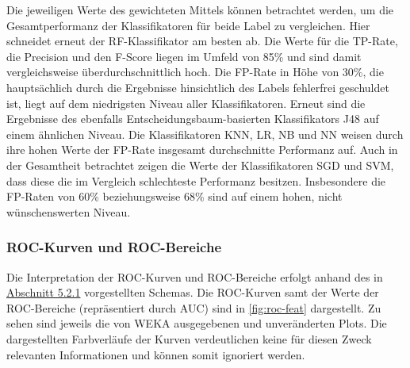 Die jeweiligen Werte des gewichteten Mittels können betrachtet werden, um die Gesamtperformanz der Klassifikatoren für beide Label zu vergleichen. Hier schneidet erneut der RF-Klassifikator am besten ab. Die Werte für die TP-Rate, die Precision und den F-Score liegen im Umfeld von 85\% und sind damit vergleichsweise überdurchschnittlich hoch. Die FP-Rate in Höhe von 30\%, die hauptsächlich durch die Ergebnisse hinsichtlich des Labels \glqq fehlerfrei\grqq{} geschuldet ist, liegt auf dem niedrigsten Niveau aller Klassifikatoren. Erneut sind die Ergebnisse des ebenfalls Entscheidungsbaum-basierten Klassifikators J48 auf einem ähnlichen Niveau. Die Klassifikatoren KNN, LR, NB und NN weisen durch ihre hohen Werte der FP-Rate insgesamt durchschnitte Performanz auf. Auch in der Gesamtheit betrachtet zeigen die Werte der Klassifikatoren SGD und SVM, dass diese die im Vergleich schlechteste Performanz besitzen. Insbesondere die FP-Raten von 60\% beziehungsweise 68\% sind auf einem hohen, nicht wünschenswerten Niveau.


\subsubsection*{ROC-Kurven und ROC-Bereiche}

Die Interpretation der ROC-Kurven und ROC-Bereiche erfolgt anhand des in \hyperref[roc-def]{Abschnitt 5.2.1} vorgestellten Schemas. Die ROC-Kurven samt der Werte der ROC-Bereiche (repräsentiert durch \glqq AUC\grqq{}) sind in \autoref{fig:roc-feat}  dargestellt. Zu sehen sind jeweils die von WEKA ausgegebenen und unveränderten Plots. Die dargestellten Farbverläufe der Kurven verdeutlichen keine für diesen Zweck relevanten Informationen und können somit ignoriert werden.

